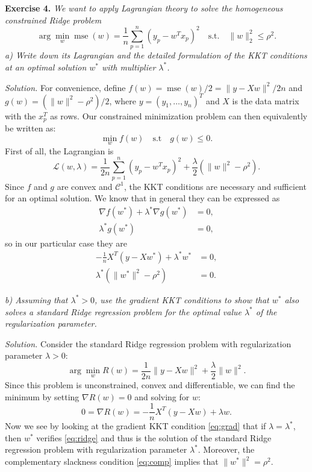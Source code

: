 \documentclass[11pt]{article}
\begin{document}
\textbf{Exercise 4.} \textit{We want to apply Lagrangian theory to solve the homogeneous constrained Ridge problem}
\[
\arg\min_w \operatorname{mse}(w) = \frac{1}{n}\sum_{p=1}^n (y_p - w^Tx_p)^2 \quad \text{s.t.} \quad \|w\|_2^2 \leq \rho^2.
\]
\textit{a) Write down its Lagrangian and the detailed formulation of the KKT conditions at an optimal solution $w^*$ with multiplier $\lambda^*$.}

\textit{Solution.} For convenience, define $f(w)=\operatorname{mse}(w)/2 = \|y-Xw\|^2/2n$ and $g(w)=(\|w\|^2 - \rho^2)/2$, where $y=(y_1,\dots,y_n)^T$ and $X$ is the data matrix with the $x_p^T$ as rows. Our constrained minimization problem can then equivalently be written as:
\[
\min_w f(w) \quad \text{s.t} \quad g(w)\leq0.
\]
First of all, the Lagrangian is
\[
\mathcal L(w, \lambda) = \frac{1}{2n}\sum_{p=1}^n (y_p - w^Tx_p)^2 + \frac{\lambda}{2}(\|w\|^2 - \rho^2).
\]
Since $f$ and $g$ are convex and $\mathscr C^1$, the KKT conditions are necessary and sufficient for an optimal solution. We know that in general they can be expressed as
\begin{align*}
\nabla f(w^*) + \lambda^*\nabla g(w^*) &=0,\\
\lambda^*g(w^*) &= 0,
\end{align*}
so in our particular case they are
\begin{align}
-\frac{1}{n}X^T\left(y-Xw^*\right) + \lambda^*w^*  &=0,\label{eq:grad}\\
\lambda^*(\|w^*\|^2 - \rho^2) &= 0\label{eq:comp}.
\end{align}

\textit{b) Assuming that $\lambda^* >0$, use the gradient KKT conditions to show that $w^*$ also solves a standard Ridge regression problem for the optimal value $\lambda^*$ of the regularization parameter.}

\textit{Solution.} Consider the standard Ridge regression problem with regularization parameter $\lambda>0$:
\[
\arg\min_w R(w)= \frac{1}{2n}\|y-Xw\|^2 + \frac{\lambda}{2}\|w\|^2.
\]
Since this problem is unconstrained, convex and differentiable, we can find the minimum by setting $\nabla R(w) = 0$ and solving for $w$:
\begin{equation}
  \label{eq:ridge}
0=\nabla R(w)= -\frac{1}{n}X^T(y-Xw) + \lambda w.
\end{equation}
Now we see by looking at the gradient KKT condition \eqref{eq:grad} that if $\lambda=\lambda^*$, then $w^*$ verifies \eqref{eq:ridge} and thus is the solution of the standard Ridge regression problem with regularization parameter $\lambda^*$. Moreover, the complementary slackness condition \eqref{eq:comp} implies that $\|w^*\|^2=\rho^2$.
\end{document}
